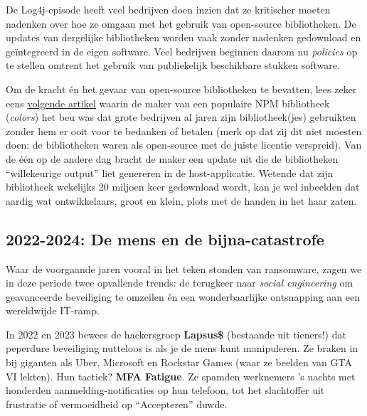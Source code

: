 \documentclass[
  10pt,
  dutch,
  paper=a4,
  ,captions=tableheading
]{scrbook}
\begin{document}
\begin{noteblock}
De Log4j-episode heeft veel bedrijven doen inzien dat ze kritischer
moeten nadenken over hoe ze omgaan met het gebruik van open-source
bibliotheken. De updates van dergelijke bibliotheken worden vaak zonder
nadenken gedownload en geïntegreerd in de eigen software. Veel bedrijven
beginnen daarom nu \emph{policies} op te stellen omtrent het gebruik van
publiekelijk beschikbare stukken software.
\end{noteblock}

\begin{tipblock}
Om de kracht én het gevaar van open-source bibliotheken te bevatten,
lees zeker eens
\href{https://www.bleepingcomputer.com/news/security/dev-corrupts-npm-libs-colors-and-faker-breaking-thousands-of-apps/}{volgende
artikel} waarin de maker van een populaire NPM bibliotheek
(\emph{colors}) het beu was dat grote bedrijven al jaren zijn
bibliotheek(jes) gebruikten zonder hem er ooit voor te bedanken of
betalen (merk op dat zij dit niet moesten doen: de bibliotheken waren
als open-source met de juiste licentie verspreid). Van de één op de
andere dag bracht de maker een update uit die de bibliotheken
``willekeurige output'' liet genereren in de host-applicatie. Wetende
dat zijn bibliotheek wekelijks 20 miljoen keer gedownload wordt, kan je
wel inbeelden dat aardig wat ontwikkelaars, groot en klein, plots met de
handen in het haar zaten.
\end{tipblock}

\subsection{2022-2024: De mens en de
bijna-catastrofe}\label{de-mens-en-de-bijna-catastrofe}

Waar de voorgaande jaren vooral in het teken stonden van ransomware,
zagen we in deze periode twee opvallende trends: de terugkeer naar
\emph{social engineering} om geavanceerde beveiliging te omzeilen én een
wonderbaarlijke ontsnapping aan een wereldwijde IT-ramp.

In 2022 en 2023 bewees de hackersgroep \textbf{Lapsus\$} (bestaande uit
tieners!) dat peperdure beveiliging nutteloos is als je de mens kunt
manipuleren. Ze braken in bij giganten als Uber, Microsoft en Rockstar
Games (waar ze beelden van GTA VI lekten). Hun tactiek? \textbf{MFA
Fatigue}. Ze spamden werknemers 's nachts met honderden
aanmelding-notificaties op hun telefoon, tot het slachtoffer uit
frustratie of vermoeidheid op ``Accepteren'' duwde.
\end{document}
